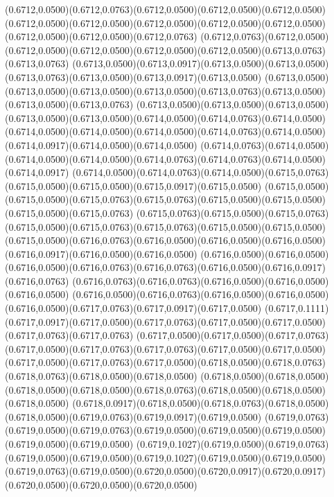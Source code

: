 (0.6712,0.0500)(0.6712,0.0763)(0.6712,0.0500)(0.6712,0.0500)(0.6712,0.0500)
\PST@Solid(0.6712,0.0500)(0.6712,0.0500)(0.6712,0.0500)(0.6712,0.0500)(0.6712,0.0500)(0.6712,0.0500)(0.6712,0.0500)(0.6712,0.0763)
(0.6712,0.0763)(0.6712,0.0500)(0.6712,0.0500)(0.6712,0.0500)(0.6712,0.0500)(0.6712,0.0500)(0.6713,0.0763)(0.6713,0.0763)
(0.6713,0.0500)(0.6713,0.0917)(0.6713,0.0500)(0.6713,0.0500)(0.6713,0.0763)(0.6713,0.0500)(0.6713,0.0917)(0.6713,0.0500)
(0.6713,0.0500)(0.6713,0.0500)(0.6713,0.0500)(0.6713,0.0500)(0.6713,0.0763)(0.6713,0.0500)(0.6713,0.0500)(0.6713,0.0763)
(0.6713,0.0500)(0.6713,0.0500)(0.6713,0.0500)(0.6713,0.0500)(0.6713,0.0500)(0.6714,0.0500)(0.6714,0.0763)(0.6714,0.0500)
(0.6714,0.0500)(0.6714,0.0500)(0.6714,0.0500)(0.6714,0.0763)(0.6714,0.0500)(0.6714,0.0917)(0.6714,0.0500)(0.6714,0.0500)
(0.6714,0.0763)(0.6714,0.0500)(0.6714,0.0500)(0.6714,0.0500)(0.6714,0.0763)(0.6714,0.0763)(0.6714,0.0500)(0.6714,0.0917)
(0.6714,0.0500)(0.6714,0.0763)(0.6714,0.0500)(0.6715,0.0763)(0.6715,0.0500)(0.6715,0.0500)(0.6715,0.0917)(0.6715,0.0500)
(0.6715,0.0500)(0.6715,0.0500)(0.6715,0.0763)(0.6715,0.0763)(0.6715,0.0500)(0.6715,0.0500)(0.6715,0.0500)(0.6715,0.0763)
(0.6715,0.0763)(0.6715,0.0500)(0.6715,0.0763)(0.6715,0.0500)(0.6715,0.0763)(0.6715,0.0763)(0.6715,0.0500)(0.6715,0.0500)
(0.6715,0.0500)(0.6716,0.0763)(0.6716,0.0500)(0.6716,0.0500)(0.6716,0.0500)(0.6716,0.0917)(0.6716,0.0500)(0.6716,0.0500)
(0.6716,0.0500)(0.6716,0.0500)(0.6716,0.0500)(0.6716,0.0763)(0.6716,0.0763)(0.6716,0.0500)(0.6716,0.0917)(0.6716,0.0763)
(0.6716,0.0763)(0.6716,0.0763)(0.6716,0.0500)(0.6716,0.0500)(0.6716,0.0500)
\PST@Solid(0.6716,0.0500)(0.6716,0.0763)(0.6716,0.0500)(0.6716,0.0500)(0.6716,0.0500)(0.6717,0.0763)(0.6717,0.0917)(0.6717,0.0500)
(0.6717,0.1111)(0.6717,0.0917)(0.6717,0.0500)(0.6717,0.0763)(0.6717,0.0500)(0.6717,0.0500)(0.6717,0.0763)(0.6717,0.0763)
(0.6717,0.0500)(0.6717,0.0500)(0.6717,0.0763)(0.6717,0.0500)(0.6717,0.0763)(0.6717,0.0763)(0.6717,0.0500)(0.6717,0.0500)
(0.6717,0.0500)(0.6717,0.0763)(0.6717,0.0500)(0.6718,0.0500)(0.6718,0.0763)(0.6718,0.0763)(0.6718,0.0500)(0.6718,0.0500)
(0.6718,0.0500)(0.6718,0.0500)(0.6718,0.0500)(0.6718,0.0500)(0.6718,0.0763)(0.6718,0.0500)(0.6718,0.0500)(0.6718,0.0500)
(0.6718,0.0917)(0.6718,0.0500)(0.6718,0.0763)(0.6718,0.0500)(0.6718,0.0500)(0.6719,0.0763)(0.6719,0.0917)(0.6719,0.0500)
(0.6719,0.0763)(0.6719,0.0500)(0.6719,0.0763)(0.6719,0.0500)(0.6719,0.0500)(0.6719,0.0500)(0.6719,0.0500)(0.6719,0.0500)
(0.6719,0.1027)(0.6719,0.0500)(0.6719,0.0763)(0.6719,0.0500)(0.6719,0.0500)(0.6719,0.1027)(0.6719,0.0500)(0.6719,0.0500)
(0.6719,0.0763)(0.6719,0.0500)(0.6720,0.0500)(0.6720,0.0917)(0.6720,0.0917)(0.6720,0.0500)(0.6720,0.0500)(0.6720,0.0500)
